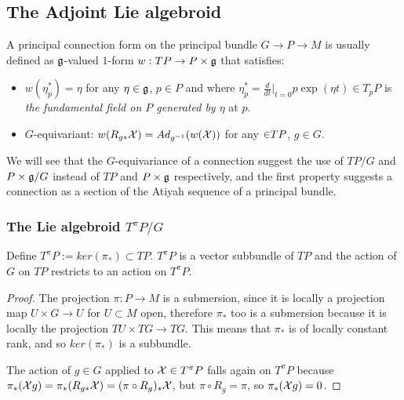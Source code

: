 \subsection{The Adjoint Lie algebroid}

A principal connection form on the principal bundle $G \to P \to M$ is usually defined as $\mathfrak{g}$-valued $1$-form  $w: TP \to P \times \mathfrak{g}$ that satisfies:

    \begin{itemize}
    
    \item $w(\eta_p^*) = \eta$ for any $\eta \in \mathfrak{g}$, $p \in P$ and where $\eta_p^* = \frac{d}{dt}\bigr|_{t = 0} p\exp(\eta t)\in T_p P$ is \emph{the fundamental field on $P$ generated by $\eta$} at $p$.
    
    \item $G$-equivariant: $w(R_{g*} \mathcal{X}) = Ad_{g^{-1}}( w(\mathcal{X}))$ for any $\mathcal{\in} TP$, $g \in G$.
    
    \end{itemize}

We will see that the $G$-equivariance of a connection suggest the use of $TP/G$ and $P \times \mathfrak{g} / G$ instead of $TP$ and $P \times \mathfrak{g}$ respectively, and the first property suggests a connection as a section of the Atiyah sequence of a principal bundle. 

\subsubsection{The Lie algebroid $T^\pi P/G$}

\begin{lemma}
Define $T^\pi P := ker(\pi_*) \subset TP$. $T^\pi P$ is a vector subbundle of $TP$ and the action of $G$ on $TP$ restricts to an action on $T^\pi P$.
\end{lemma}

\begin{proof}
The projection $\pi:P \to M$ is a submersion, since it is locally a projection map $U \times G \to U$ for $U \subset M$ open, therefore $\pi_*$ too is a submersion because it is locally the projection $TU \times TG \to TG$. This means that $\pi_*$ is of locally constant rank, and so $ker(\pi_*)$ is a subbundle.

The action of $g \in G$ applied to $\mathcal{X} \in T^\pi P$ falls again on $T^\pi P$ because $\pi_*(\mathcal{X}g) = \pi_*(R_{g*} \mathcal{X}) = (\pi \circ R_g)_* \mathcal{X}$, but $\pi \circ R_g = \pi$, so $\pi_*(\mathcal{X}g) = 0$.
\end{proof}


